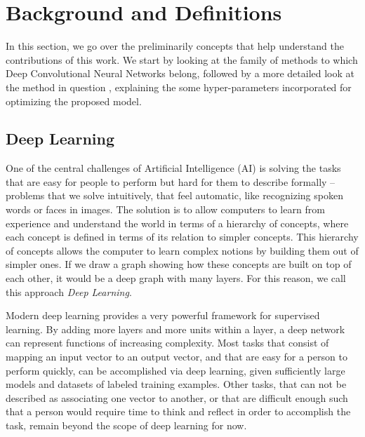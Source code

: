 \chapter{Background and Definitions}
\label{sec:Background}
In this section, we go over the preliminarily concepts that help understand the contributions of this work. We start by looking at the family of methods to which Deep Convolutional Neural Networks belong, followed by a more detailed look at the method in question , explaining the some hyper-parameters incorporated for optimizing the proposed model.

\section{Deep Learning}

One of the central challenges of Artificial Intelligence (AI) is solving the tasks that are easy for people to perform but hard for them to describe formally -- problems that we solve intuitively, that feel automatic, like recognizing spoken words or faces in images.  The solution is to allow computers to learn from experience and understand the world in terms of a hierarchy of concepts, where each concept is defined in terms of its relation to simpler concepts. This hierarchy of concepts allows the computer to learn complex notions by building them out of simpler ones. If we draw a graph showing how these concepts are built on top of each other, it would be a deep graph with many layers. For this reason, we call this approach \textit{Deep Learning}\cite{Goodfellow-et-al-2016-Book}.

Modern deep learning provides a very powerful framework for supervised learning. By adding more layers and more units within a layer, a deep network can represent functions of increasing complexity. Most tasks that consist of mapping an input vector to an output vector, and that are easy for a person to perform quickly, can be accomplished via deep learning, given sufficiently large models and datasets of labeled training examples. Other tasks, that can not be described as associating one vector to another, or that are difficult enough such that a person would require time to think and reflect in order to accomplish the task, remain beyond the scope of deep learning for now\cite{Goodfellow-et-al-2016-Book}.

